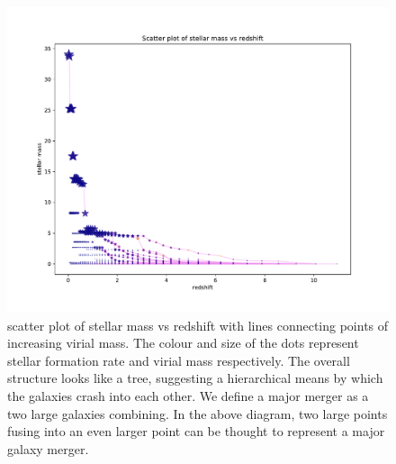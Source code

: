 \documentclass{article}
\begin{document}
\begin{figure}
  \includegraphics[width=\linewidth]{first merger tree.pdf}
  \caption{scatter plot of stellar mass vs redshift with lines connecting points of increasing virial mass. The colour and size of the dots represent stellar formation rate and virial mass respectively. The overall structure looks like a tree, suggesting a hierarchical means by which the galaxies crash into each other. We define a major merger as a two large galaxies combining. In the above diagram, two large points fusing into an even larger point can be thought to represent a major galaxy merger.}
  \label{fig:first_merger_tree}

\end{figure}
\end{document}
